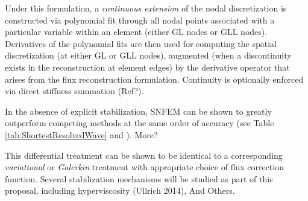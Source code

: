 \documentclass[11pt]{article}
\begin{document}
Under this formulation, a \textit{continuous extension} of the nodal discretization is constructed via polynomial fit through all nodal points associated with a particular variable within an element (either GL nodes or GLL nodes).  Derivatives of the polynomial fits are then used for computing the spatial discretization (at either GL or GLL nodes), augmented (when a discontinuity exists in the reconstruction at element edges) by the derivative operator that arises from  the flux reconstruction formulation.  Continuity is optionally enforced via direct stiffness summation {\color{red}(Ref?)}.

In the absence of explicit stabilization, SNFEM can be shown to greatly outperform competing methods at the same order of accuracy (see Table \ref{tab:ShortestResolvedWave} and \cite{PAU2013QJRMS}). {\color{blue} More?}

This differential treatment can be shown to be identical to a corresponding \textit{variational} or \textit{Galerkin} treatment with appropriate choice of flux correction function.  Several stabilization mechanisms will be studied as part of this proposal, including hyperviscosity \citep{OGMNLJROMATPAU2013} {\color{red}(Ullrich 2014)}, {\color{blue} And Others}.





\end{document}
